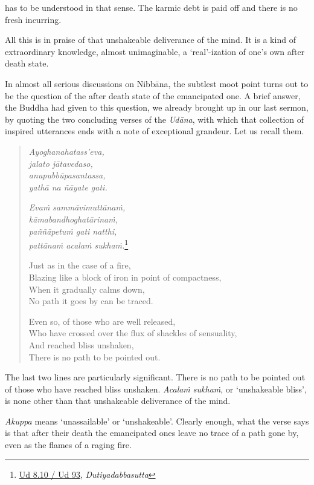 has to be understood in that sense. The karmic debt is paid off and there is no fresh incurring.

All this is in praise of that unshakeable deliverance of the mind. It is a kind of extraordinary knowledge, almost unimaginable, a `real'-ization of one's own after death state.

In almost all serious discussions on Nibbāna, the subtlest moot point turns out to be the question of the after death state of the emancipated one. A brief answer, the Buddha had given to this question, we already brought up in our last sermon, by quoting the two concluding verses of the \emph{Udāna}, with which that collection of inspired utterances ends with a note of exceptional grandeur. Let us recall them.

\begin{quote}
\emph{Ayoghanahatass'eva,}\\
\emph{jalato jātavedaso,}\\
\emph{anupubbūpasantassa,}\\
\emph{yathā na ñāyate gati.}

\emph{Evaṁ sammāvimuttānaṁ,}\\
\emph{kāmabandhoghatārinaṁ,}\\
\emph{paññāpetuṁ gati natthi,}\\
\emph{pattānaṁ acalaṁ sukhaṁ.}\footnote{\href{https://suttacentral.net/ud8.10/pli/ms}{Ud 8.10 / Ud 93}, \emph{Dutiyadabbasutta}}

\clearpage

Just as in the case of a fire,\\
Blazing like a block of iron in point of compactness,\\
When it gradually calms down,\\
No path it goes by can be traced.

Even so, of those who are well released,\\
Who have crossed over the flux of shackles of sensuality,\\
And reached bliss unshaken,\\
There is no path to be pointed out.
\end{quote}

The last two lines are particularly significant. There is no path to be pointed out of those who have reached bliss unshaken. \emph{Acalaṁ sukhaṁ}, or `unshakeable bliss', is none other than that unshakeable deliverance of the mind.

\emph{Akuppa} means `unassailable' or `unshakeable'. Clearly enough, what the verse says is that after their death the emancipated ones leave no trace of a path gone by, even as the flames of a raging fire.

